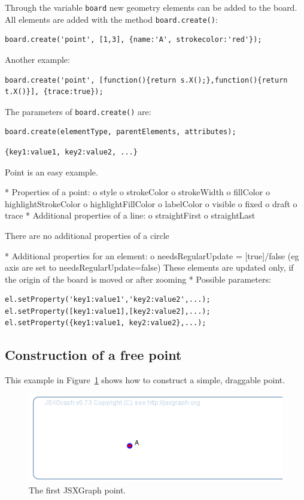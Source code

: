Through the variable \lstinline|board| new geometry elements can be added to the board. All elements are added with the method \lstinline|board.create()|: 
\begin{lstlisting}
board.create('point', [1,3], {name:'A', strokecolor:'red'});
\end{lstlisting}

Another example: 
\begin{lstlisting}
board.create('point', [function(){return s.X();},function(){return t.X()}], {trace:true});
\end{lstlisting}

The parameters of \lstinline|board.create()| are: 
\begin{lstlisting}
board.create(elementType, parentElements, attributes);
\end{lstlisting}

\begin{lstlisting}
{key1:value1, key2:value2, ...}
\end{lstlisting}

Point is an easy example.

    * Properties of a point:
          o style
          o strokeColor
          o strokeWidth
          o fillColor
          o highlightStrokeColor
          o highlightFillColor
          o labelColor
          o visible
          o fixed
          o draft
          o trace 
    * Additional properties of a line:
          o straightFirst
          o straightLast 

There are no additional properties of a circle

    * Additional properties for an element:
          o needsRegularUpdate = [true]/false (eg axis are set to needsRegularUpdate=false) These elements are updated only, if the origin of the board is moved or after zooming 
    * Possible parameters: 

\begin{lstlisting}
el.setProperty('key1:value1','key2:value2',...);
el.setProperty([key1:value1],[key2:value2],...);
el.setProperty({key1:value1, key2:value2},...);
\end{lstlisting}

\subsection{Construction of a free point}
This example in Figure~\ref{fig:2} shows how to construct a simple, draggable point. 
\begin{figure}[htb]
\includegraphics[width=0.4\linewidth]{images/b3.png}
\caption{The first JSXGraph point.}\label{fig:2}
\end{figure}

